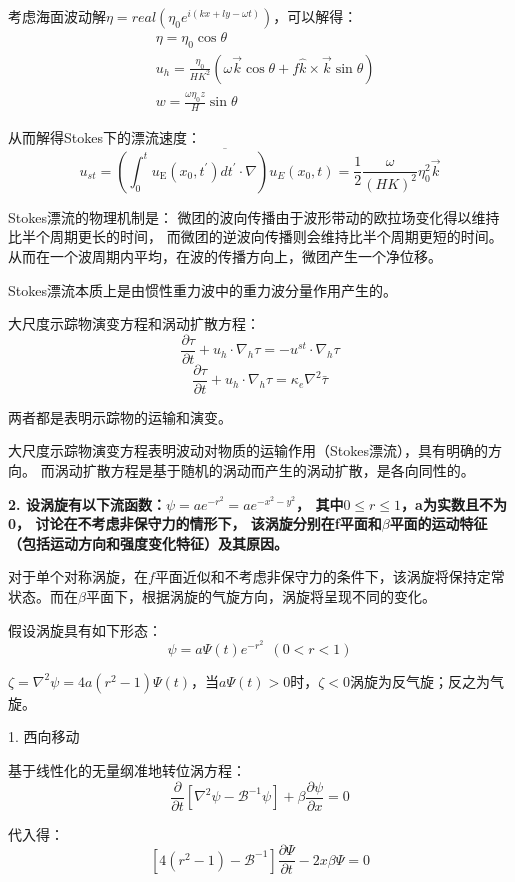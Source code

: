 \documentclass{article}
\begin{document}
考虑海面波动解$\eta = real(\eta_0e^{i(kx+ly-\omega t)})$，可以解得：
\begin{align}
    &\eta = \eta_0\cos\theta \\
    &u_h = \frac{\eta_0}{HK^2}(\omega\vec{k}\cos\theta + f\hat{k}\times\vec{k}\sin\theta)\\
    &w = \frac{\omega\eta_0z}{H}\sin\theta
\end{align}

从而解得Stokes下的漂流速度：
$$u_{st}=\overline{(\int_{0}^{t}{{{u}_{\text{E}}}({{x}_{0}},t^{\prime})}dt^{\prime}\cdot \nabla ){{u}_{E}}({{x}_{0}},t)} = \frac{1}{2}\frac{\omega}{(HK)^2}\eta_0^2\vec{k}$$

Stokes漂流的物理机制是：
微团的波向传播由于波形带动的欧拉场变化得以维持比半个周期更长的时间，
而微团的逆波向传播则会维持比半个周期更短的时间。
从而在一个波周期内平均，在波的传播方向上，微团产生一个净位移。

Stokes漂流本质上是由惯性重力波中的重力波分量作用产生的。

大尺度示踪物演变方程和涡动扩散方程：
$$\frac{\partial \tau }{\partial t}+{{u}_{h}}\cdot {{\nabla }_{h}}\tau 
=-{{u}^{st}}\cdot {{\nabla }_{h}}\tau$$
$$\frac{\partial \tau }{\partial t}+{{u}_{h}}\cdot {{\nabla }_{h}}\tau 
={{\kappa }_{e}}\nabla^2\bar{\tau }$$

两者都是表明示踪物的运输和演变。

大尺度示踪物演变方程表明波动对物质的运输作用（Stokes漂流），具有明确的方向。
而涡动扩散方程是基于随机的涡动而产生的涡动扩散，是各向同性的。


\textbf{2. 设涡旋有以下流函数：$\psi = ae^{-r^2} = ae^{-x^2-y^2}$，
其中$0\le r\le 1$，a为实数且不为0，
讨论在不考虑非保守力的情形下，
该涡旋分别在f平面和$\beta$平面的运动特征（包括运动方向和强度变化特征）及其原因。}

对于单个对称涡旋，在$f$平面近似和不考虑非保守力的条件下，该涡旋将保持定常状态。而在$\beta$平面下，根据涡旋的气旋方向，涡旋将呈现不同的变化。

假设涡旋具有如下形态：
$$\psi = a\Psi(t)e^{-r^2} \ \ (0<r<1)$$

$\zeta={{\nabla }}^{2}{{\psi }} = 4a(r^2-1)\Psi(t)$，当$a\Psi(t)>0$时，$\zeta<0$涡旋为反气旋；反之为气旋。

1. 西向移动

基于线性化的无量纲准地转位涡方程：
$$\frac{\partial }{\partial {{t}}}\left[ {{\nabla }}^{2}{{\psi }}-{\mathcal{B}^{-1}}{{\psi }} \right]+{{\beta }}\frac{\partial {{\psi }}}{\partial {{x}}}=0$$

代入得：
$$\left[ 4({{r}^{2}}-1)-{{\mathcal{B}}^{-1}} \right]\frac{\partial \Psi }{\partial t}-2x\beta \Psi =0$$
\end{document}
